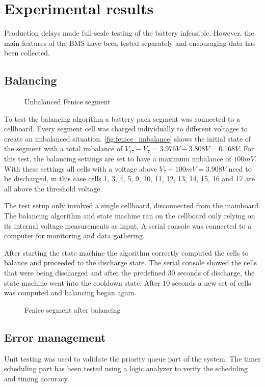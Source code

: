 \chapter{Experimental results}

Production delays made full-scale testing of the battery infeasible. However, the main features of the BMS have been tested separately and encouraging data has been collected.

\section{Balancing}
\begin{figure}[h]
	\centering
	
	\caption{Unbalanced Fenice segment}
	\label{fig:fenice_imbalance}
\end{figure}
To test the balancing algorithm a battery pack segment was connected to a cellboard. Every segment cell was charged individually to different voltages to create an imbalanced situation. \autoref{fig:fenice_imbalance} shows the initial state of the segment with a total imbalance of $V_{17} - V_{7} = 3.976V - 3.808V = 0.168V$. For this test, the balancing settings are set to have a maximum imbalance of $100mV$. With these settings all cells with a voltage above $V_{7} + 100mV = 3.908V$ need to be discharged, in this case cells 1, 3, 4, 5, 9, 10, 11, 12, 13, 14, 15, 16 and 17 are all above the threshold voltage.

The test setup only involved a single cellboard, disconnected from the mainboard. The balancing algorithm and state machine ran on the cellboard only relying on its internal voltage measurements as input. A serial console was connected to a computer for monitoring and data gathering.

After starting the state machine the algorithm correctly computed the cells to balance and proceeded to the discharge state. The serial console showed the cells that were being discharged and after the predefined 30 seconds of discharge, the state machine went into the cooldown state. After 10 seconds a new set of cells was computed and balancing began again.
\begin{figure}[h]
	\centering
	
	\caption{Fenice segment after balancing}
	\label{fig:fenice_balanced}
\end{figure}

\section{Error management}
Unit testing was used to validate the priority queue part of the system. The timer scheduling part has been tested using a logic analyzer to verify the scheduling and timing accuracy.

